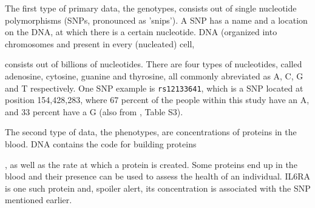 The first type of primary data, the genotypes, 
consists out of single nucleotide polymorphisms (SNPs, pronounced as 'snips').
A SNP has a name and a location on the DNA, at which there is a certain nucleotide.
DNA (organized into chromosomes and present in every (nucleated) cell, 

consists out of billions of nucleotides.
There are four types of nucleotides, 
called adenosine, cytosine, guanine and thyrosine, all commonly abreviated
as A, C, G and T respectively.
One SNP example is \verb|rs12133641|, which is a SNP located at position 
154,428,283, where 67 percent of the people within this study have an A,
and 33 percent have a G (also from \cite{ahsan2017relative}, Table S3).

The second type of data, the phenotypes, 
are concentrations of proteins in the blood. 
DNA contains the code for building proteins

, as well as the rate
at which a protein is created. Some proteins end up in the blood and
their presence can be used to assess the health of an individual.
IL6RA is one such protein and, spoiler alert, its concentration
is associated with the SNP mentioned earlier.

